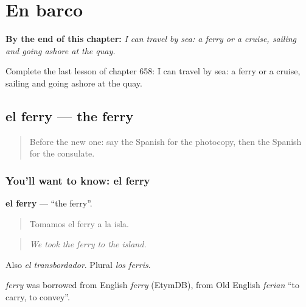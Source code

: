 
\chapter{En barco}
\label{ch:es-en-barco}

\begin{chapteropening}
\textbf{By the end of this chapter:} \emph{I can travel by sea: a ferry or a cruise, sailing and going ashore at the quay.}

Complete the last lesson of chapter 658: I can travel by sea: a ferry or a cruise, sailing and going ashore at the quay.
\end{chapteropening}

\section[el ferry]{el ferry — the ferry}

\label{lesson:ES-C658-ferry}



\begin{quote}
Before the new one: say the Spanish for the photocopy, then the Spanish for the consulate.
\end{quote}

\subsection*{You'll want to know: el ferry}
\textbf{el ferry} — \textquotedblleft{}the ferry\textquotedblright{}.

\begin{quote}
Tomamos el ferry a la isla.
\end{quote}

\begin{quote}
\emph{We took the ferry to the island.}
\end{quote}

Also \emph{el transbordador}. Plural \emph{los ferris}.

\begin{cousinweb}
\emph{ferry} was borrowed from English \emph{ferry} (EtymDB), from Old English \emph{ferian} \textquotedblleft{}to carry, to convey\textquotedblright{}.
\end{cousinweb}


